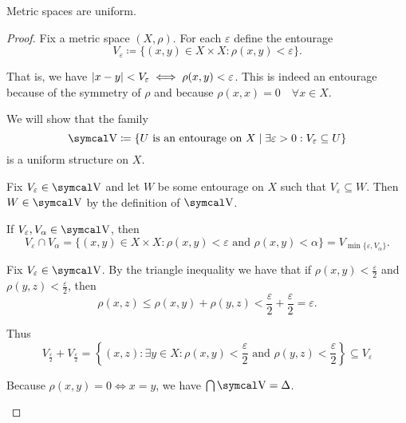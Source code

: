\begin{proposition}\label{thm:metric_spaces_are_uniform}
  Metric spaces are uniform.
\end{proposition}
\begin{proof}
  Fix a metric space \( (X, \rho) \). For each \( \varepsilon \) define the entourage
  \begin{equation*}
    V_\varepsilon \coloneqq \{ (x, y) \in X \times X \colon \rho(x, y) < \varepsilon \}.
  \end{equation*}

  That is, we have \( \left\vert x - y \right\vert < V_\varepsilon \iff \rho(x, y) < \varepsilon \). This is indeed an entourage because of the symmetry of \( \rho \) and because \( \rho(x, x) = 0 \quad\forall x \in X \).

  We will show that the family
  \begin{equation*}
    \V \coloneqq \{ U \text{ is an entourage on } X \mid \exists \varepsilon > 0: V_\varepsilon \subseteq U \}
  \end{equation*}
  is a uniform structure on \( X \).

  \begin{description}
     Fix \( V_\varepsilon \in \V \) and let \( W \) be some entourage on \( X \) such that \( V_\varepsilon \subseteq W \). Then \( W \in \V \) by the definition of \( \V \).

     If \( V_\varepsilon, V_\alpha \in \V \), then
    \begin{equation*}
      V_\varepsilon \cap V_\alpha
      =
      \{ (x, y) \in X \times X \colon \rho(x, y) < \varepsilon \text{ and } \rho(x, y) < \alpha \}
      =
      V_{\min\{\varepsilon, V_\alpha \}}.
    \end{equation*}

     Fix \( V_\varepsilon \in \V \). By the triangle inequality we have that if \( \rho(x, y) < \frac \varepsilon 2 \) and \( \rho(y, z) < \frac \varepsilon 2 \), then
    \begin{equation*}
       \rho(x, z) \leq \rho(x, y) + \rho(y, z) < \frac \varepsilon 2 + \frac \varepsilon 2 = \varepsilon.
    \end{equation*}

    Thus
    \begin{equation*}
      V_{\frac \varepsilon 2} + V_{\frac \varepsilon 2}
      =
      \left\{ (x, z) \colon \exists y \in X: \rho(x, y) < \frac \varepsilon 2 \text{ and } \rho(y, z) < \frac \varepsilon 2 \right\}
      \subseteq
      V_\varepsilon
    \end{equation*}

     Because \( \rho(x, y) = 0 \iff x = y \), we have \( \bigcap \V = \Delta \).
  \end{description}
\end{proof}

